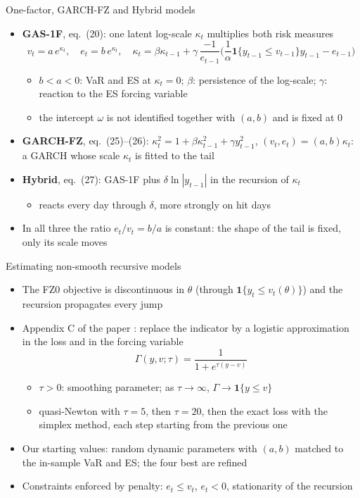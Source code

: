 \begin{frame}{One-factor, GARCH-FZ and Hybrid models}
\itemsize{\footnotesize}
\begin{itemize}
    \item \textbf{GAS-1F}, eq.~(20): one latent log-scale $\kappa_t$ multiplies both risk measures
    \[ v_t = a\,e^{\kappa_t}, \quad e_t = b\,e^{\kappa_t}, \quad \kappa_t = \beta\kappa_{t-1} + \gamma\,\frac{-1}{e_{t-1}}\Big(\frac{1}{\alpha}\mathbf 1\{y_{t-1} \le v_{t-1}\}y_{t-1} - e_{t-1}\Big) \]
    \begin{itemize}
        \item $b < a < 0$: VaR and ES at $\kappa_t = 0$; $\beta$: persistence of the log-scale; $\gamma$: reaction to the ES forcing variable
        \item the intercept $\omega$ is not identified together with $(a, b)$ and is fixed at 0
    \end{itemize}
    \item \textbf{GARCH-FZ}, eq.~(25)--(26): $\kappa_t^2 = 1 + \beta\kappa_{t-1}^2 + \gamma y_{t-1}^2$, $(v_t, e_t) = (a, b)\kappa_t$: a GARCH whose scale $\kappa_t$ is fitted to the tail
    \item \textbf{Hybrid}, eq.~(27): GAS-1F plus $\delta\ln|y_{t-1}|$ in the recursion of $\kappa_t$
    \begin{itemize}
        \item reacts every day through $\delta$, more strongly on hit days
    \end{itemize}
    \item In all three the ratio $e_t/v_t = b/a$ is constant: the shape of the tail is fixed, only its scale moves
\end{itemize}
\end{frame}

\begin{frame}{Estimating non-smooth recursive models}
\itemsize{\small}
\begin{itemize}
    \item The FZ0 objective is discontinuous in $\theta$ (through $\mathbf 1\{y_t \le v_t(\theta)\}$) and the recursion propagates every jump
    \item Appendix C of the paper : replace the indicator by a logistic approximation in the loss and in the forcing variable
    \[ \Gamma(y, v; \tau) = \frac{1}{1 + e^{\tau(y - v)}} \]
    \begin{itemize}
        \item $\tau > 0$: smoothing parameter; as $\tau \to \infty$, $\Gamma \to \mathbf 1\{y \le v\}$
        \item quasi-Newton with $\tau = 5$, then $\tau = 20$, then the exact loss with the simplex method, each step starting from the previous one
    \end{itemize}
    \item Our starting values: random dynamic parameters with $(a, b)$ matched to the in-sample VaR and ES; the four best are refined
    \item Constraints enforced by penalty: $e_t \le v_t$, $e_t < 0$, stationarity of the recursion
\end{itemize}
\end{frame}

